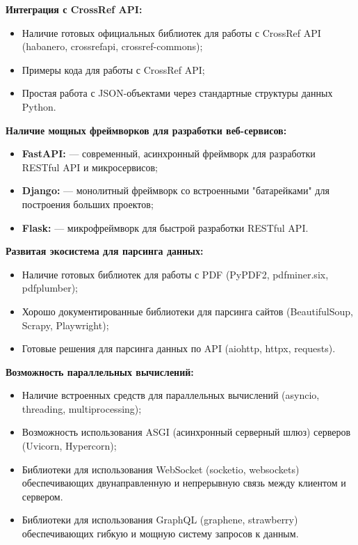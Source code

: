 \begin{compactenum}
	\item \textbf{Интеграция с CrossRef API:}
	\begin{itemize}
		\item Наличие готовых официальных библиотек для работы с CrossRef API (habanero, crossrefapi, crossref-commons);
		\item Примеры кода для работы с CrossRef API;
		\item Простая работа с JSON-объектами через стандартные структуры данных Python.
	\end{itemize}

	\item \textbf{Наличие мощных фреймворков для разработки веб-сервисов:}
		\begin{itemize}
			\item \textbf{FastAPI:} --- современный, асинхронный фреймворк для разработки RESTful API и микросервисов;
			\item \textbf{Django:} --- монолитный фреймворк со встроенными "батарейками" для построения больших проектов;
			\item \textbf{Flask:} --- микрофреймворк для быстрой разработки RESTful API.
		\end{itemize}

	\item \textbf{Развитая экосистема для парсинга данных:}
	    \begin{itemize}
			\item Наличие готовых библиотек для работы с PDF (PyPDF2, pdfminer.six, pdfplumber);
			\item Хорошо документированные библиотеки для парсинга сайтов (BeautifulSoup, Scrapy, Playwright);
			\item Готовые решения для парсинга данных по API (aiohttp, httpx, requests).
		\end{itemize}
	
	\item \textbf{Возможность параллельных вычислений:}
		\begin{itemize}
			\item Наличие встроенных средств для параллельных вычислений (asyncio, threading, multiprocessing);
			\item Возможность использования ASGI (асинхронный серверный шлюз) серверов (Uvicorn, Hypercorn);
			\item Библиотеки для использования WebSocket (socketio, websockets) обеспечивающих двунаправленную и непрерывную связь между клиентом и сервером.
			\item Библиотеки для использования GraphQL (graphene, strawberry) обеспечивающих гибкую и мощную систему запросов к данным.
		\end{itemize}


\end{compactenum}
